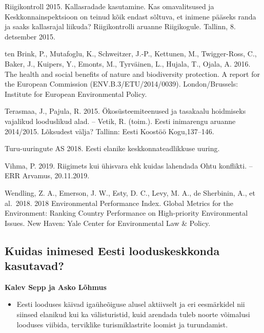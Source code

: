 \documentclass[estonian,]{article}
\providecommand{\tightlist}{%
  \setlength{\itemsep}{0pt}\setlength{\parskip}{0pt}}
\begin{document}
Riigikontroll 2015. Kallasradade kasutamine. Kas omavalitsused ja Keskkonnainspektsioon on teinud kõik endast sõltuva, et inimene pääseks randa ja saaks kallasrajal liikuda? Riigikontrolli aruanne Riigikogule. Tallinn, 8. detsember 2015.

ten Brink, P., Mutafoglu, K., Schweitzer, J.-P., Kettunen, M., Twigger-Ross, C., Baker, J., Kuipers, Y., Emonts, M., Tyrväinen, L., Hujala, T., Ojala, A. 2016. The health and social benefits of nature and biodiversity protection. A report for the European Commission (ENV.B.3/ETU/2014/0039). London/Brussels: Institute for European Environmental Policy.

Terasmaa, J., Pajula, R. 2015. Ökosüsteemiteenused ja tasakaalu hoidmiseks vajalikud looduslikud alad. -- Vetik, R. (toim.). Eesti inimarengu aruanne 2014/2015. Lõksudest välja? Tallinn: Eesti Koostöö Kogu,137--146.

Turu-uuringute AS 2018. Eesti elanike keskkonnateadlikkuse uuring.

Vihma, P. 2019. Riigimets kui ühisvara ehk kuidas lahendada Ohtu konflikti. -- ERR Arvamus, 20.11.2019.

Wendling, Z. A., Emerson, J. W., Esty, D. C., Levy, M. A., de Sherbinin, A., et al.~2018. 2018 Environmental Performance Index. Global Metrics for the Environment: Ranking Country Performance on High-priority Environmental Issues. New Haven: Yale Center for Environmental Law \& Policy.

\hypertarget{kuidas-inimesed-eesti-looduskeskkonda-kasutavad}{%
\subsection{Kuidas inimesed Eesti looduskeskkonda kasutavad?}\label{kuidas-inimesed-eesti-looduskeskkonda-kasutavad}}

\begin{authors}
\textbf{Kalev Sepp ja Asko Lõhmus}
\end{authors}

\begin{points}
\begin{itemize}
\tightlist
\item
  Eesti looduses käivad igaüheõiguse alusel aktiivselt ja eri
  eesmärkidel nii siinsed elanikud kui ka välisturistid, kuid arendada
  tuleb noorte võimalusi looduses viibida, terviklike turismiklastrite
  loomist ja turundamist.
\end{itemize}
\end{points}
\end{document}
